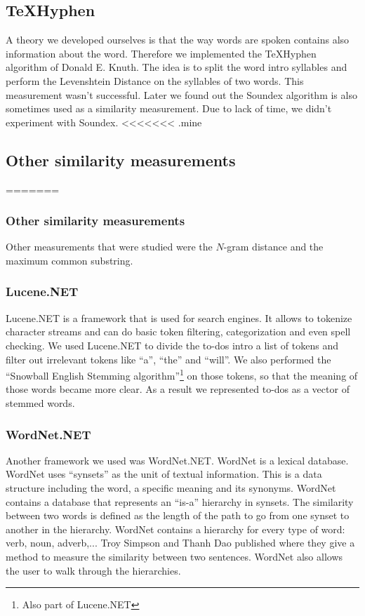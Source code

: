 \documentclass[a4paper,titlepage]{article}
\begin{document}
\subsection{TeXHyphen}
A theory we developed ourselves is that the way words are spoken contains also information about the word. Therefore we implemented the TeXHyphen algorithm\cite[p.376-406]{knuth1986tex} of Donald E. Knuth. The idea is to split the word intro syllables and perform the Levenshtein Distance on the syllables of two words. This measurement wasn't successful. Later we found out the Soundex algorithm is also sometimes used as a similarity measurement. Due to lack of time, we didn't experiment with Soundex.
<<<<<<< .mine
\subsection{Other similarity measurements}
=======
\subsubsection{Other similarity measurements}
Other measurements that were studied were the $N$-gram distance and the maximum common substring.
\subsubsection{Lucene.NET}
Lucene.NET is a framework that is used for search engines. It allows to tokenize character streams and can do basic token filtering, categorization and even spell checking. We used Lucene.NET to divide the to-dos intro a list of tokens and filter out irrelevant tokens like ``a'', ``the'' and ``will''. We also performed the ``Snowball English Stemming algorithm''\footnote{Also part of Lucene.NET} on those tokens, so that the meaning of those words became more clear. As a result we represented to-dos as a vector of stemmed words.
\subsubsection{WordNet.NET}
Another framework we used was WordNet.NET. WordNet is a lexical database. WordNet uses ``synsets'' as the unit of textual information. This is a data structure including the word, a specific meaning and its synonyms. WordNet contains a database that represents an ``is-a'' hierarchy in synsets. The similarity between two words is defined as the length of the path to go from one synset to another in the hierarchy. WordNet contains a hierarchy for every type of word: verb, noun, adverb,... Troy Simpson and Thanh Dao published \cite{codeproject1} where they give a method to measure the similarity between two sentences. WordNet also allows the user to walk through the hierarchies.
\end{document}
